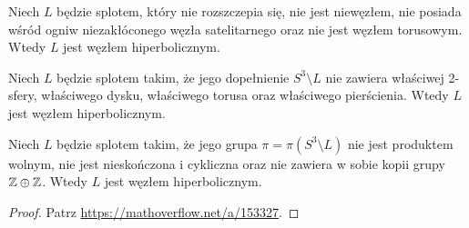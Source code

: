 \begin{proposition}
    Niech $L$ będzie splotem, który nie rozszczepia się, nie jest niewęzłem, nie posiada wśród ogniw niezakłóconego węzła satelitarnego oraz nie jest węzłem torusowym.
    Wtedy $L$ jest węzłem hiperbolicznym.
\end{proposition}

\begin{proposition}
    Niech $L$ będzie splotem takim, że jego dopełnienie $S^3 \setminus L$ nie zawiera właściwej 2-sfery, właściwego dysku, właściwego torusa oraz właściwego pierścienia.
    Wtedy $L$ jest węzłem hiperbolicznym.
\end{proposition}

\begin{proposition}
    Niech $L$ będzie splotem takim, że jego grupa $\pi = \pi(S^3 \setminus L)$ nie jest produktem wolnym, nie jest nieskończona i cykliczna oraz nie zawiera w sobie kopii grupy $\mathbb Z \oplus \mathbb Z$.
    Wtedy $L$ jest węzłem hiperbolicznym.
\end{proposition}

\begin{proof}
    Patrz \url{https://mathoverflow.net/a/153327}.
\end{proof}

